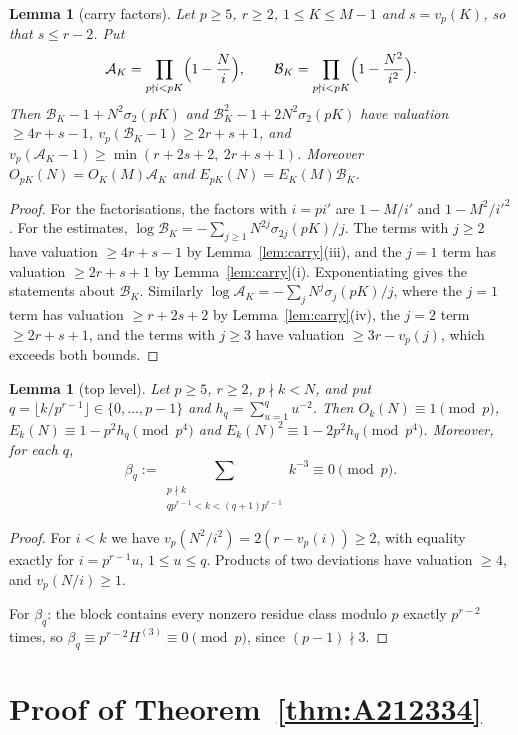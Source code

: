 \documentclass[11pt]{amsart}
\newtheorem{lemma}[theorem]{Lemma}
\theoremstyle{definition}
\theoremstyle{remark}
\newcommand{\vp}{v_p}
\begin{document}
\begin{lemma}[carry factors]\label{lem:cf}
Let $p\ge5$, $r\ge2$, $1\le K\le M-1$ and $s=\vp(K)$, so that $s\le r-2$. Put
\[
\mathcal A_K=\prod_{p\nmid i<pK}\Bigl(1-\frac Ni\Bigr),\qquad
\mathcal B_K=\prod_{p\nmid i<pK}\Bigl(1-\frac{N^2}{i^2}\Bigr).
\]
Then $\mathcal B_K-1+N^2\sigma_2(pK)$ and $\mathcal B_K^2-1+2N^2\sigma_2(pK)$ have valuation
$\ge 4r+s-1$, $\vp(\mathcal B_K-1)\ge 2r+s+1$, and
$\vp(\mathcal A_K-1)\ge\min(r+2s+2,\ 2r+s+1)$. Moreover
$O_{pK}(N)=O_K(M)\mathcal A_K$ and $E_{pK}(N)=E_K(M)\mathcal B_K$.
\end{lemma}
\begin{proof}
For the factorisations, the factors with $i=pi'$ are $1-M/i'$ and $1-M^2/i'^2$. For the
estimates, $\log\mathcal B_K=-\sum_{j\ge1}N^{2j}\sigma_{2j}(pK)/j$. The terms with $j\ge2$
have valuation $\ge 4r+s-1$ by Lemma~\ref{lem:carry}(iii), and the $j=1$ term has valuation
$\ge2r+s+1$ by Lemma~\ref{lem:carry}(i). Exponentiating gives the statements about
$\mathcal B_K$. Similarly $\log\mathcal A_K=-\sum_jN^j\sigma_j(pK)/j$, where the $j=1$ term has
valuation $\ge r+2s+2$ by Lemma~\ref{lem:carry}(iv), the $j=2$ term $\ge 2r+s+1$, and the terms
with $j\ge3$ have valuation $\ge 3r-\vp(j)$, which exceeds both bounds.
\end{proof}

\begin{lemma}[top level]\label{lem:top}
Let $p\ge5$, $r\ge2$, $p\nmid k<N$, and put $q=\lfloor k/p^{r-1}\rfloor\in\{0,\dots,p-1\}$ and
$h_q=\sum_{u=1}^qu^{-2}$. Then $O_k(N)\equiv1\pmod p$,
$E_k(N)\equiv1-p^2h_q\pmod{p^4}$ and $E_k(N)^2\equiv1-2p^2h_q\pmod{p^4}$. Moreover, for
each $q$,
\[
\beta_q:=\sum_{\substack{p\nmid k\\ qp^{r-1}<k<(q+1)p^{r-1}}}k^{-3}\equiv0\pmod p .
\]
\end{lemma}
\begin{proof}
For $i<k$ we have $\vp(N^2/i^2)=2(r-\vp(i))\ge2$, with equality exactly for $i=p^{r-1}u$,
$1\le u\le q$. Products of two deviations have valuation $\ge4$, and $\vp(N/i)\ge1$.

For $\beta_q$: the block contains every nonzero residue class modulo $p$ exactly $p^{r-2}$
times, so $\beta_q\equiv p^{r-2}H^{(3)}\equiv 0\pmod p$, since $(p-1)\nmid3$.
\end{proof}

\section{Proof of Theorem~\ref{thm:A212334}}
\end{document}
